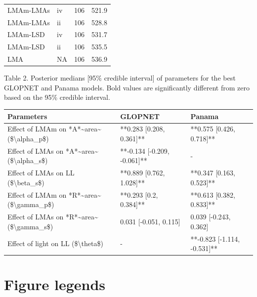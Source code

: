 \documentclass[
  12pt,
  letterpaper,
  DIV=11,
  numbers=noendperiod]{scrartcl}
\begin{document}
\begin{table}
\begin{tabular}{llrr}
\hspace{1em}LMAm-LMAs & iv & 106 & 521.9\\
\hspace{1em}LMAm-LMAs & ii & 106 & 528.8\\
\hspace{1em}LMAm-LSD & iv & 106 & 531.7\\
\hspace{1em}LMAm-LSD & ii & 106 & 535.5\\
\hspace{1em}LMA & NA & 106 & 536.9\\
\bottomrule
\end{tabular}
\end{table}

\newpage

Table 2. Posterior medians {[}95\% credible interval{]} of parameters
for the best GLOPNET and Panama models. Bold values are significantly
different from zero based on the 95\% credible interval.

\begin{longtable*}[t]{lll}
\toprule
Parameters & GLOPNET & Panama\\
\midrule
Effect of LMAm on *A*\textasciitilde{}area\textasciitilde{} (\$\textbackslash{}alpha\_p\$) & **0.283 [0.208, 0.361]** & **0.575 [0.426, 0.718]**\\
Effect of LMAs on *A*\textasciitilde{}area\textasciitilde{} (\$\textbackslash{}alpha\_s\$) & **-0.134 [-0.209, -0.061]** & -\\
Effect of LMAs on LL (\$\textbackslash{}beta\_s\$) & **0.889 [0.762, 1.028]** & **0.347 [0.163, 0.523]**\\
Effect of LMAm on *R*\textasciitilde{}area\textasciitilde{} (\$\textbackslash{}gamma\_p\$) & **0.293 [0.2, 0.384]** & **0.613 [0.382, 0.833]**\\
Effect of LMAs on *R*\textasciitilde{}area\textasciitilde{} (\$\textbackslash{}gamma\_s\$) & 0.031 [-0.051, 0.115] & 0.039 [-0.243, 0.362]\\
\addlinespace
Effect of light on LL (\$\textbackslash{}theta\$) & - & **-0.823 [-1.114, -0.531]**\\
\bottomrule
\end{longtable*}

\newpage

\section{Figure legends}\label{figure-legends}
\end{document}
